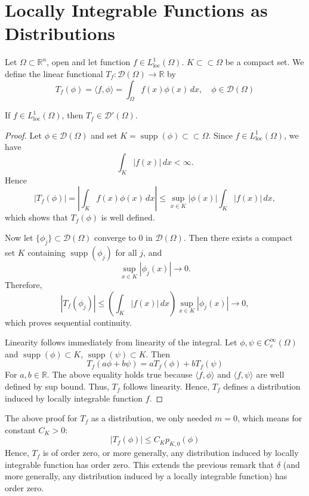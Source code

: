 \section{Locally Integrable Functions as Distributions}

\begin{definition}[$T_f$]
    Let $\Omega\subset\mathbb{R}^n$, open and let function $f\in L_{\text{loc}}^1(\Omega)$. $K\subset\subset\Omega$ be a compact set. We define the linear functional $T_f:\mathcal{D}(\Omega)\to\mathbb{R}$ by
    \[
    T_f(\phi)
    =
    \langle f,\phi\rangle
    =\int_\Omega f(x)\phi(x)\,dx,  \quad \phi \in \mathcal{D}(\Omega)
    \]
    \end{definition}
\begin{proposition}
    If $f\in L^1_{\mathrm{loc}}(\Omega)$,
    then $T_f\in\mathcal{D}'(\Omega)$.
\end{proposition}
    \begin{proof}
Let $\phi \in \mathcal{D}(\Omega)$ and set 
$K = \operatorname{supp}(\phi) \subset\subset \Omega$. 
Since $f \in L^1_{\mathrm{loc}}(\Omega)$, we have
\[
\int_K |f(x)|\,dx < \infty.
\]
Hence
\[
|T_f(\phi)|
=
\left|\int_K f(x)\phi(x)\,dx\right|
\le
\sup_{x\in K} |\phi(x)|
\int_K |f(x)|\,dx,
\]
which shows that $T_f(\phi)$ is well defined.

Now let $\{\phi_j\}\subset \mathcal{D}(\Omega)$ 
converge to $0$ in $\mathcal{D}(\Omega)$. 
Then there exists a compact set $K$ containing 
$\operatorname{supp}(\phi_j)$ for all $j$, and
\[
\sup_{x\in K} |\phi_j(x)| \to 0.
\]
Therefore,
\[
|T_f(\phi_j)|
\le
\left(\int_K |f(x)|\,dx\right)
\sup_{x\in K} |\phi_j(x)|
\to 0,
\]
which proves sequential continuity.

Linearity follows immediately from linearity of the integral. Let $\phi,\psi\in C_c^\infty(\Omega)$ and $\operatorname{supp}(\phi)\subset K$, $\operatorname{supp}(\psi)\subset K$. Then
    \[
    T_f(a\phi+b\psi)=aT_f(\phi)+bT_f(\psi)
    \]
    For $a, b\in\mathbb{R}$. The above equality holds true because $\langle f, \phi\rangle$ and $\langle f, \psi\rangle$ are well defined by sup bound. Thus, $T_f$ follows linearity. Hence, $T_f$ defines a distribution induced by locally integrable function $f$. 
\end{proof}
\begin{remark}
    The above proof for $T_f$ as a distribution, we only needed $m=0$, which means for constant $C_K>0$:
    \[
    |T_f(\phi)|\le C_K p_{K,0}(\phi)
    \]
    Hence, $T_f$ is of order zero, or more generally, any distribution induced by locally integrable function has order zero. This extends the previous remark that $\delta$ (and more generally, any distribution induced by a locally integrable function) has order zero. 
\end{remark}
